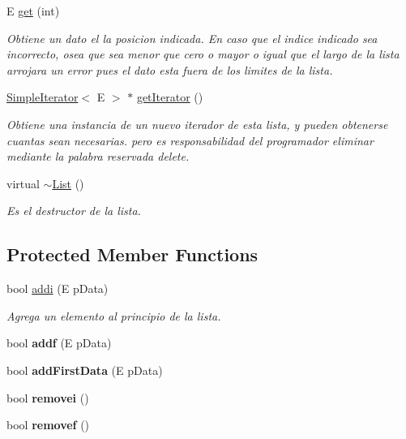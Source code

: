 \begin{DoxyCompactItemize}
E \hyperlink{class_list_ab081a52d7a62aa6c5550ff9762f9427f}{get} (int)
\begin{DoxyCompactList}\small\item\em Obtiene un dato el la posicion indicada. En caso que el indice indicado sea incorrecto, osea que sea menor que cero o mayor o igual que el largo de la lista arrojara un error pues el dato esta fuera de los limites de la lista. \end{DoxyCompactList}\item 
\hyperlink{class_simple_iterator}{Simple\-Iterator}$<$ E $>$ $\ast$ \hyperlink{class_list_accb5fe71cb60ba7bf0ccab362b1f87cb}{get\-Iterator} ()
\begin{DoxyCompactList}\small\item\em Obtiene una instancia de un nuevo iterador de esta lista, y pueden obtenerse cuantas sean necesarias. pero es responsabilidad del programador eliminar mediante la palabra reservada delete. \end{DoxyCompactList}\item 
\hypertarget{class_list_a0af4c4d8a3d0710e58b12db35f9b0a3d}{virtual \hyperlink{class_list_a0af4c4d8a3d0710e58b12db35f9b0a3d}{$\sim$\-List} ()}\label{class_list_a0af4c4d8a3d0710e58b12db35f9b0a3d}

\begin{DoxyCompactList}\small\item\em Es el destructor de la lista. \end{DoxyCompactList}\end{DoxyCompactItemize}
\subsection*{Protected Member Functions}
\begin{DoxyCompactItemize}
\item 
bool \hyperlink{class_list_a92ad933f8d3a033b84a517fb6cc4111a}{addi} (E p\-Data)
\begin{DoxyCompactList}\small\item\em Agrega un elemento al principio de la lista. \end{DoxyCompactList}\item 
\hypertarget{class_list_a3c920f9c86d2853121c5cd2fb46f8436}{bool {\bfseries addf} (E p\-Data)}\label{class_list_a3c920f9c86d2853121c5cd2fb46f8436}

\item 
\hypertarget{class_list_ac38635d10f3faaf49af53c0b66347d0f}{bool {\bfseries add\-First\-Data} (E p\-Data)}\label{class_list_ac38635d10f3faaf49af53c0b66347d0f}

\item 
\hypertarget{class_list_a1d0a5649ddd83cb781174698f80b2e0f}{bool {\bfseries removei} ()}\label{class_list_a1d0a5649ddd83cb781174698f80b2e0f}

\item 
\hypertarget{class_list_a45231b54bf8c98948becddd0923be138}{bool {\bfseries removef} ()}\label{class_list_a45231b54bf8c98948becddd0923be138}

\end{DoxyCompactItemize}
